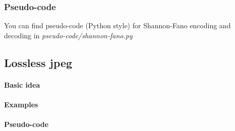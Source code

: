 \subsubsection*{Pseudo-code}
You can find pseudo-code (Python style) for Shannon-Fano encoding and decoding in \textit{pseudo-code/shannon-fano.py}
\subsection{Lossless jpeg}
\paragraph*{Basic idea}
\paragraph*{Examples}
\paragraph*{Pseudo-code}
